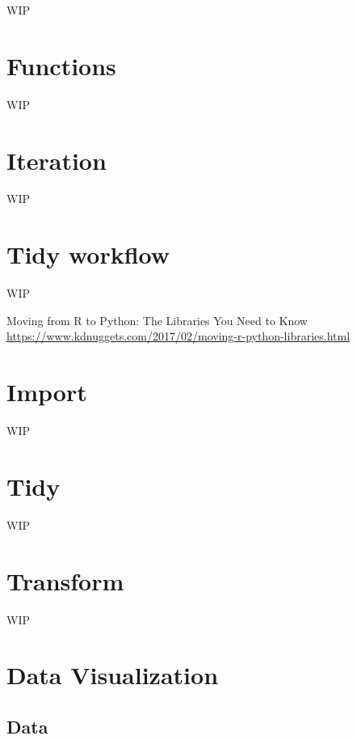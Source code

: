 \documentclass[]{book}
\begin{document}
WIP

\hypertarget{functions}{%
\chapter{Functions}\label{functions}}

WIP

\hypertarget{iteration}{%
\chapter{Iteration}\label{iteration}}

WIP

\hypertarget{tidy-workflow}{%
\chapter{Tidy workflow}\label{tidy-workflow}}

WIP

Moving from R to Python: The Libraries You Need to Know \url{https://www.kdnuggets.com/2017/02/moving-r-python-libraries.html}

\hypertarget{import}{%
\chapter{Import}\label{import}}

WIP

\hypertarget{tidy}{%
\chapter{Tidy}\label{tidy}}

WIP

\hypertarget{transform}{%
\chapter{Transform}\label{transform}}

WIP

\hypertarget{data-visualization}{%
\chapter{Data Visualization}\label{data-visualization}}

\hypertarget{data}{%
\section{Data}\label{data}}
\end{document}
